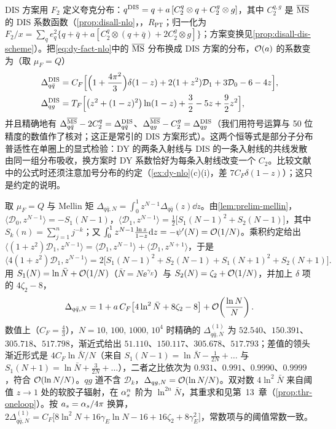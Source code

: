 \begin{remark}\label{rem:dy-dis-scheme}
DIS 方案用 $F_2$ 定义夸克分布：$q^{\rm DIS}=q+a\,[C_2^q\otimes q+C_2^g\otimes g]$，其中 $C_2^{q,g}$ 是 $\overline{\mathrm{MS}}$ 的 DIS 系数函数（\cref{prop:disall-nlo}，\tagR，$R_{\mathrm{PT}}$；归一化为 $F_2/x=\sum_qe_q^2\{q+\bar q+a[C_2^q\otimes(q+\bar q)+2C_2^g\otimes g]\}$；方案变换见\cref{prop:disall-dis-scheme}）。把\cref{eq:dy-fact-nlo}中的 $\overline{\mathrm{MS}}$ 分布换成 DIS 方案的分布，$\mathcal{O}\!\left(a\right)$ 的系数变为（取 $\mu_F=Q$）
\[
\begin{aligned}
\Delta^{\rm DIS}_{q\bar q}&=C_F\Big[\Big(1+\frac{4\pi^2}3\Big)\delta(1-z)+2(1+z^2)\mathcal D_1+3\mathcal D_0-6-4z\Big],\\
\Delta^{\rm DIS}_{qg}&=T_F\Big[\big(z^2+(1-z)^2\big)\ln(1-z)+\frac32-5z+\frac92z^2\Big],
\end{aligned}
\]
并且精确地有 $\Delta^{\overline{\mathrm{MS}}}_{q\bar q}-2C_2^q=\Delta^{\rm DIS}_{q\bar q}$、$\Delta^{\overline{\mathrm{MS}}}_{qg}-C_2^g=\Delta^{\rm DIS}_{qg}$（我们用符号运算与 50 位精度的数值作了核对；这正是常引的 DIS 方案形式）。这两个恒等式是部分子分布普适性在单圈上的显式检验：DY 的两条入射线与 DIS 的一条入射线的共线发散由同一组分布吸收，换方案时 DY 系数恰好为每条入射线改变一个 $C_2$。比较文献中的公式时还须注意加号分布的约定（\cref{ex:dy-nlo}(c)(i)，差 $7C_F\delta(1-z)$）；这只是约定的说明。
\end{remark}

\begin{example}[大 $N$ 极限]\label{ex:dy-threshold}
取 $\mu_F=Q$ 与 Mellin 矩 $\Delta_{q\bar q,N}=\int_0^1z^{N-1}\Delta_{q\bar q}(z)\dd z$。由\cref{lem:prelim-mellin}，$\langle\mathcal D_0,z^{N-1}\rangle=-S_1(N-1)$，$\langle\mathcal D_1,z^{N-1}\rangle=\frac12\big[S_1(N-1)^2+S_2(N-1)\big]$，其中 $S_k(n)=\sum_{j=1}^nj^{-k}$；又 $\int_0^1z^{N-1}\frac{\ln z}{1-z}\mathrm{d} z=-\psi'(N)=\mathcal{O}\!\left(1/N\right)$。乘积约定给出 $\langle(1+z^2)\mathcal D_1,z^{N-1}\rangle=\langle\mathcal D_1,z^{N-1}\rangle+\langle\mathcal D_1,z^{N+1}\rangle$，于是
\[
\langle4(1+z^2)\mathcal D_1,z^{N-1}\rangle=2\big[S_1(N-1)^2+S_2(N-1)+S_1(N+1)^2+S_2(N+1)\big].
\]
用 $S_1(N)=\ln\bar N+\mathcal{O}\!\left(1/N\right)$（$\bar N=N\ee^{\gamma_E}$）与 $S_2(N)=\zeta_2+\mathcal{O}\!\left(1/N\right)$，并加上 $\delta$ 项的 $4\zeta_2-8$，
\[
\Delta_{q\bar q,N}=1+a\,C_F\big[4\ln^2\bar N+8\zeta_2-8\big]+\mathcal{O}\!\left(\frac{\ln N}{N}\right) .
\]
数值上（$C_F=\frac43$），$N=10,\,100,\,1000,\,10^4$ 时精确的 $\Delta^{(1)}_{q\bar q,N}$ 为 $52.540$、$150.391$、$305.718$、$517.798$，渐近式给出 $51.110$、$150.117$、$305.678$、$517.793$；差值的领头渐近形式是 $4C_F\ln\bar N/N$（来自 $S_1(N-1)=\ln\bar N-\frac1{2N}+\dots$ 与 $S_1(N+1)=\ln\bar N+\frac3{2N}+\dots$），二者之比依次为 $0.931$、$0.991$、$0.9990$、$0.9999$，符合 $\mathcal{O}\!\left(\ln N/N\right)$。$qg$ 道不含 $\mathcal D_k$，$\Delta_{qg,N}=\mathcal{O}\!\left(\ln N/N\right)$。双对数 $4\ln^2\bar N$ 来自阈值 $z\to1$ 处的软胶子辐射，在 $\alpha_s^n$ 阶为 $\ln^{2n}\bar N$，其重求和见第~13~章（\cref{prop:thr-oneloop}）。按 $a_s=\alpha_s/4\pi$ 换算，$2\Delta^{(1)}_{q\bar q,N}=C_F\big[8\ln^2N+16\gamma_E\ln N-16+16\zeta_2+8\gamma_E^2\big]$，常数项与\cite{Moch:2005ky}的阈值常数一致。
\end{example}

